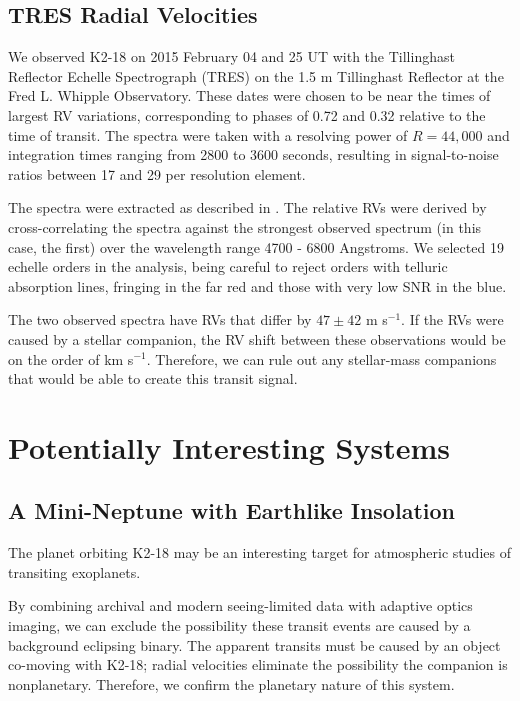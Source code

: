 \subsection{TRES Radial Velocities}

We observed K2-18 on 2015 February 04 and 25 UT
with the Tillinghast Reflector Echelle
Spectrograph (TRES) on the 1.5 m Tillinghast Reflector at the Fred L.
Whipple Observatory.
These dates were chosen to be near the times of largest RV variations,
corresponding to phases of 0.72 and 0.32 relative to the time
of transit.
The spectra were taken with a resolving power of $R=44,000$ and
integration times ranging from 2800 to 3600 seconds, resulting in
signal-to-noise ratios between 17 and 29 per resolution element.

The spectra were extracted as described in \citet{Buchhave10}.
The relative RVs were derived by cross-correlating the spectra against the
strongest observed spectrum (in this case, the first) over the wavelength
range 4700 - 6800 Angstroms.
We selected 19 echelle orders in the analysis, being careful to reject
orders with telluric absorption lines, fringing in the far red and those
with very low SNR in the blue.

The two observed spectra have RVs that differ by $47 \pm 42$ m s$^{-1}$.
If the RVs were caused by a stellar companion, the RV shift between these
observations would be on the order of km s$^{-1}$.
Therefore, we can rule out any stellar-mass companions that would be able
to create this transit signal.




\section{Potentially Interesting Systems}
\subsection{A Mini-Neptune with Earthlike Insolation}

The planet orbiting K2-18 may be an interesting target for
atmospheric studies of transiting exoplanets.

By combining archival and modern seeing-limited data with adaptive optics
imaging, we can exclude the possibility these transit events are caused by
a background eclipsing binary.
The apparent transits must be caused by an object co-moving with K2-18;
radial velocities eliminate the possibility the companion is nonplanetary.
Therefore, we confirm the planetary nature of this system.

